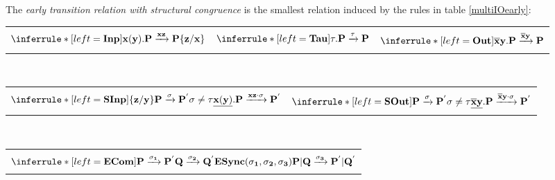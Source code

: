 \begin{definition}
  The \emph{early transition relation with structural congruence} is the smallest relation induced by the rules in table \ref{multiIOearly}:
  \begin{table}
    \begin{tabular}{lll}
	  \hline\\
	  $\inferrule* [left=\bf{Inp}]{
	  }{
	    x(y).P \xrightarrow{xz} P\{z/x\}
	  }$
	&
	  $\inferrule* [left=\bf{Tau}]{
	  }{
	    \tau.P \xrightarrow{\tau} P
	  }$
	&
	  $\inferrule* [left=\bf{Out}]{
	  }{
	    \overline{x}y.P \xrightarrow{\overline{x}y} P
	  }$
      \\\\
      \end{tabular}\\
      \begin{tabular}{ll}
      \\\\
	  $\inferrule* [left=\bf{SInp}]{
	      \{z/y\}P \xrightarrow{\sigma} P^{'} 
	    \\
	      \sigma\neq \tau
	  }{
	    \underline{x(y)}.P \xrightarrow{xz \cdot \sigma} P^{'}
	  }$
	&
	  $\inferrule* [left=\bf{SOut}]{
	      P \xrightarrow{\sigma} P^{'} 
	    \\
	      \sigma\neq \tau
	  }{
	    \underline{\overline{x}y}.P \xrightarrow{\overline{x}y \cdot \sigma} P^{'}
	  }$
      \\\\
      \end{tabular}\\
      \begin{tabular}{l}
      \\\\
	  $\inferrule* [left=\bf{ECom}]{
	      P \xrightarrow{\sigma_{1}} P^{'}
	    \\
	      Q\xrightarrow{\sigma_{2}} Q^{'}
	    \\
	      ESync(\sigma_{1}, \sigma_{2}, \sigma_{3})
	  }{
	    P|Q \xrightarrow{\sigma_{3}} P^{'}|Q^{'}
	  }$
      \\\\
      \end{tabular}\\
\end{table}
\end{definition}
